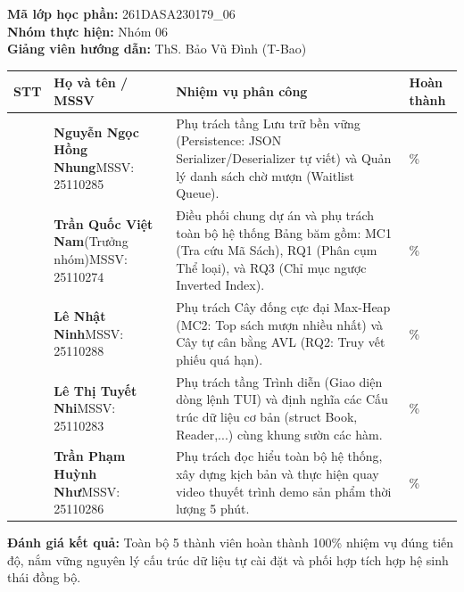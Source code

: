 \documentclass[14pt,a4paper]{extarticle}
\begin{document}
\vspace{-0.25cm}
\noindent
\textbf{Mã lớp học phần:} 261DASA230179\_06\\[0.1cm]
\textbf{Nhóm thực hiện:} Nhóm 06\\[0.1cm]
\textbf{Giảng viên hướng dẫn:} ThS. Bảo Vũ Đình (T-Bao)\\[0.25cm]
\noindent
\begingroup
{}
\setlength{\tabcolsep}{3pt}
\renewcommand{\arraystretch}{1.0}
\begin{tabularx}{\linewidth}{|>{\centering\arraybackslash}m{1.2cm}|>{\raggedright\arraybackslash}m{3.5cm}|>{\raggedright\arraybackslash}X|>{\centering\arraybackslash}m{2.2cm}|}
\hline
\textbf{STT} & \textbf{Họ và tên / MSSV} & \textbf{Nhiệm vụ phân công} & \textbf{Hoàn thành} \\ \hline
1 & \textbf{Nguyễn Ngọc Hồng Nhung}\newline MSSV: 25110285 & Phụ trách tầng Lưu trữ bền vững (Persistence: JSON Serializer/Deserializer tự viết) và Quản lý danh sách chờ mượn (Waitlist Queue). & 100\% \\ \hline
2 & \textbf{Trần Quốc Việt Nam}\newline (Trưởng nhóm)\newline MSSV: 25110274 & Điều phối chung dự án và phụ trách toàn bộ hệ thống Bảng băm gồm: MC1 (Tra cứu Mã Sách), RQ1 (Phân cụm Thể loại), và RQ3 (Chỉ mục ngược Inverted Index). & 100\% \\ \hline
3 & \textbf{Lê Nhật Ninh}\newline MSSV: 25110288 & Phụ trách Cây đống cực đại Max-Heap (MC2: Top sách mượn nhiều nhất) và Cây tự cân bằng AVL (RQ2: Truy vết phiếu quá hạn). & 100\% \\ \hline
4 & \textbf{Lê Thị Tuyết Nhi}\newline MSSV: 25110283 & Phụ trách tầng Trình diễn (Giao diện dòng lệnh TUI) và định nghĩa các Cấu trúc dữ liệu cơ bản (struct Book, Reader,...) cùng khung sườn các hàm. & 100\% \\ \hline
5 & \textbf{Trần Phạm Huỳnh Như}\newline MSSV: 25110286 & Phụ trách đọc hiểu toàn bộ hệ thống, xây dựng kịch bản và thực hiện quay video thuyết trình demo sản phẩm thời lượng 5 phút. & 100\% \\ \hline
\end{tabularx}
\endgroup

\vspace{0.25cm}
\noindent
\textbf{Đánh giá kết quả:} Toàn bộ 5 thành viên hoàn thành 100\% nhiệm vụ đúng tiến độ, nắm vững nguyên lý cấu trúc dữ liệu tự cài đặt và phối hợp tích hợp hệ sinh thái đồng bộ.
\endgroup
\end{document}
